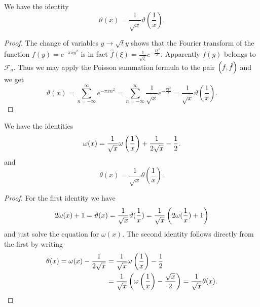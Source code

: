 \begin{lemma}
	We have the identity
\begin{equation*}
	\vartheta(x) = \frac{1}{\sqrt{x}} \vartheta(\frac{1}{x}).
\end{equation*}
\end{lemma}
\begin{proof}
	The change of variables $y \to \sqrt{t} y$ shows that the Fourier transform of the function $f(y) = e^{-\pi x y^2}$ is in fact $\hat{f}(\xi) = \frac{1}{\sqrt{\xi}} e^{-\frac{\pi \xi^2}{x}}$. Apparently $f(y)$ belongs to $\mathcal{F}_a$. Thus we may apply the Poisson summation formula to the pair $\left(f, \hat{f}\right)$ and we get
\begin{equation*}
	\vartheta(x) = \sum _{n = -\infty} ^\infty e^{-\pi x n^2} = \sum _{n = -\infty} ^\infty \frac{1}{\sqrt{x}} e^{-\frac{\pi \xi^2}{x}} = \frac{1}{\sqrt{x}} \vartheta(\frac{1}{x}).
\end{equation*}
\end{proof}


\begin{corollary}\label{cor:ThetaIdentity}
	We have the identities
\begin{equation*}
	\omega(x) = \frac{1}{\sqrt{x}} \omega\left(\frac{1}{x}\right) + \frac{1}{2\sqrt{x}} - \frac{1}{2}.
\end{equation*}
	and
\begin{equation*}
	\theta(x) = \frac{1}{\sqrt{x}} \theta(\frac{1}{x}).
\end{equation*}
\end{corollary}
\begin{proof}
	For the first identity we have
\begin{equation*}
	2 \omega(x) + 1 = \vartheta(x) = \frac{1}{\sqrt{x}} \vartheta(\frac{1}{x}) = \frac{1}{\sqrt{x}} \left(2 \omega(\frac{1}{x}) + 1\right)
\end{equation*}
	and just solve the equation for $\omega(x)$. The second identity follows directly from the first by writing
\begin{equation*}
\begin{aligned}	
	\theta(x) = \omega(x) - \frac{1}{2 \sqrt{x}} 
	&= \frac{1}{\sqrt{x}} \omega\left(\frac{1}{x}\right) - \frac{1}{2} \\ 
	&= \frac{1}{\sqrt{x}} \left(\omega\left(\frac{1}{x}\right) - \frac{\sqrt{x}}{2}\right) = \frac{1}{\sqrt{x}} \theta(x).
\end{aligned}
\end{equation*}
\end{proof}


